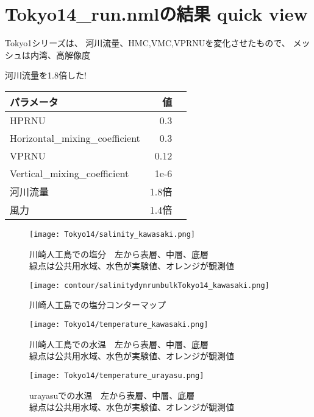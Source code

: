 \documentclass[fontsize=12pt,paper=a4]{jlreq}
\begin{document}
\section{Tokyo14\_run.nmlの結果 quick view}
Tokyo1シリーズは、 河川流量、HMC,VMC,VPRNUを変化させたもので、
メッシュは内湾、高解像度

河川流量を1.8倍した!
\begin{table}
  \begin{minipage}[hbtp]{0.5\hsize}
    \begin{tabular}{lrr} \toprule
      パラメータ & 値 \\ \midrule
      HPRNU & 0.3\\
      Horizontal\_mixing\_coefficient & 0.3\\
      VPRNU & 0.12\\
      Vertical\_mixing\_coefficient & 1e-6\\
      河川流量 & 1.8倍 \\
      風力 & 1.4倍\\ \bottomrule
    \end{tabular}
  \end{minipage}
\end{table}

\begin{figure}[hbtp]
        \centering
        \texttt{[image: Tokyo14/salinity\_kawasaki.png]}
        \caption{川崎人工島での塩分　左から表層、中層、底層\\緑点は公共用水域、水色が実験値、オレンジが観測値}
\end{figure}

\begin{figure}[hbtp]
        \centering
        \texttt{[image: contour/salinitydynrunbulkTokyo14\_kawasaki.png]}
        \caption{川崎人工島での塩分コンターマップ}
\end{figure}


\begin{figure}[hbtp]
        \centering
        \texttt{[image: Tokyo14/temperature\_kawasaki.png]}
        \caption{川崎人工島での水温　左から表層、中層、底層\\緑点は公共用水域、水色が実験値、オレンジが観測値}
\end{figure}
\begin{figure}[hbtp]
  \centering
  \texttt{[image: Tokyo14/temperature\_urayasu.png]}
  \caption{urayasuでの水温　左から表層、中層、底層\\緑点は公共用水域、水色が実験値、オレンジが観測値}
\end{figure}
\end{document}
